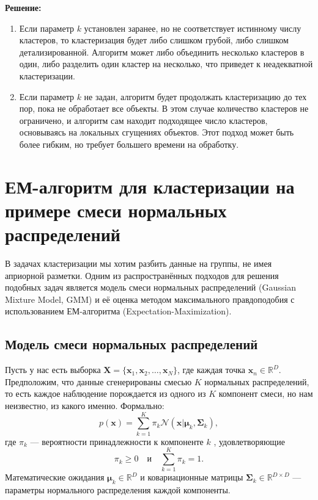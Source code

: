 \textbf{Решение:}
\begin{enumerate}
    \item Если параметр \( k \) установлен заранее, но не соответствует истинному числу кластеров, то кластеризация будет либо слишком грубой, либо слишком детализированной. Алгоритм может либо объединить несколько кластеров в один, либо разделить один кластер на несколько, что приведет к неадекватной кластеризации.
    \item Если параметр \( k \) не задан, алгоритм будет продолжать кластеризацию до тех пор, пока не обработает все объекты. В этом случае количество кластеров не ограничено, и алгоритм сам находит подходящее число кластеров, основываясь на локальных сгущениях объектов. Этот подход может быть более гибким, но требует большего времени на обработку.
\end{enumerate}


\section{ЕМ-алгоритм для кластеризации на примере смеси нормальных распределений}

В задачах кластеризации мы хотим разбить данные на группы, не имея априорной разметки. Одним из распространённых подходов для решения подобных задач является модель смеси нормальных распределений (Gaussian Mixture Model, GMM) и её оценка методом максимального правдоподобия с использованием ЕМ-алгоритма (Expectation-Maximization).

\subsection{Модель смеси нормальных распределений}

Пусть у нас есть выборка $\mathbf{X} = \{\mathbf{x}_1, \mathbf{x}_2, \ldots, \mathbf{x}_N\}$, где каждая точка $\mathbf{x}_n \in \mathbb{R}^D$. Предположим, что данные сгенерированы смесью $K$ нормальных распределений, то есть каждое наблюдение порождается из одного из $K$ компонент смеси, но нам неизвестно, из какого именно. Формально:
\begin{equation*}
    p(\mathbf{x}) = \sum_{k=1}^{K} \pi_k \mathcal{N}(\mathbf{x}|\boldsymbol{\mu}_k, \boldsymbol{\Sigma}_k),
\end{equation*}
где $\pi_k$ --- вероятности принадлежности к компоненте $k$ , удовлетворяющие 
\begin{equation*}
    \pi_k \geq 0 \quad \text{и} \quad \sum_{k=1}^K \pi_k = 1.
\end{equation*}
Математические ожидания $\boldsymbol{\mu}_k \in \mathbb{R}^D$ и ковариационные матрицы $\boldsymbol{\Sigma}_k \in \mathbb{R}^{D \times D}$ --- параметры нормального распределения каждой компоненты.

